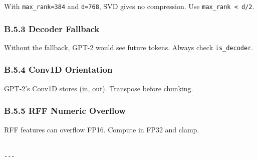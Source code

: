 With \texttt{max\_rank=384} and \texttt{d=768}, SVD gives no compression. Use 
\texttt{max\_rank \textless{} d/2}.

\subsubsection{B.5.3 Decoder Fallback}

Without the fallback, GPT-2 would see future tokens. Always check 
\texttt{is\_decoder}.

\subsubsection{B.5.4 Conv1D Orientation}

GPT-2's Conv1D stores (in, out). Transpose before chunking.

\subsubsection{B.5.5 RFF Numeric Overflow}

RFF features can overflow FP16. Compute in FP32 and clamp.
\begin{lstlisting}

---
\end{lstlisting}